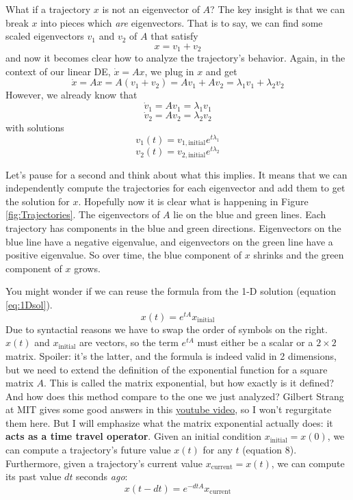 \documentclass[11pt, oneside]{article}   	%
\begin{document}
What if a trajectory $x$ is not an eigenvector of $A$?
The key insight is that we can break $x$ into pieces which \textit{are} eigenvectors.
That is to say, we can find some scaled eigenvectors $v_1$ and $v_2$ of $A$ that satisfy
\begin{equation}
x = v_1 + v_2
\end{equation}
and now it becomes clear how to analyze the trajectory's behavior.
Again, in the context of our linear DE, $\dot{x} = Ax$, we plug in $x$ and get
\begin{equation}
\dot{x} = Ax
= A(v_1 + v_2)
= A v_1 + A v_2
= \lambda_1 v_1 + \lambda_2 v_2
\end{equation}
However, we already know that
$$ \dot{v}_1 = A v_1 = \lambda_1 v_1 $$
$$ \dot{v}_2 = A v_2 = \lambda_2 v_2 $$
with solutions
$$ v_1(t) = v_{1,\mathrm{initial}} e^{t\lambda_1} $$
$$ v_2(t) = v_{2,\mathrm{initial}} e^{t\lambda_2} $$

Let's pause for a second and think about what this implies.
It means that we can independently compute the trajectories for each eigenvector and add them to get the solution for $x$.
Hopefully now it is clear what is happening in Figure \ref{fig:Trajectories}.
The eigenvectors of $A$ lie on the blue and green lines.
Each trajectory has components in the blue and green directions.
Eigenvectors on the blue line have a negative eigenvalue, and eigenvectors on the green line have a positive eigenvalue.
So over time, the blue component of $x$ shrinks and the green component of $x$ grows.

You might wonder if we can reuse the formula from the 1-D solution (equation \ref{eq:1Dsol}).
\begin{equation}
x(t) = e^{tA} x_\mathrm{initial}
\end{equation}
Due to syntactial reasons we have to swap the order of symbols on the right.
$x(t)$ and $x_\mathrm{initial}$ are vectors, so the term $e^{tA}$ must either be a scalar or a $2\times 2$ matrix.
Spoiler: it's the latter, and the formula is indeed valid in 2 dimensions,
but we need to extend the definition of the exponential function for a square matrix $A$.
This is called the matrix exponential, but how exactly is it defined?
And how does this method compare to the one we just analyzed?
Gilbert Strang at MIT gives some good answers in this \href{https://youtu.be/LwSk9M5lJx4}{youtube video},
so I won't regurgitate them here.
But I will emphasize what the matrix exponential actually does: it \textbf{acts as a time travel operator}.
Given an initial condition $x_\mathrm{initial} = x(0)$, we can compute a trajectory's future value $x(t)$ for any $t$ (equation 8).
Furthermore, given a trajectory's current value $x_\mathrm{current} = x(t)$, we can compute its past value $dt$ seconds \textit{ago}:
\begin{equation}
x(t-dt) = e^{-dtA} x_\mathrm{current}
\end{equation}
\end{document}
